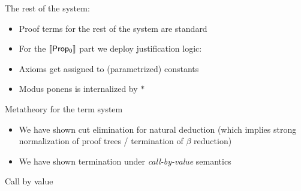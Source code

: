 \documentclass{beamer}
\begin{document}
  \begin{frame}{The rest of the system}:
    \begin{itemize}
    \item[] Proof terms for the rest of the system are standard
    \item[] For the ${\sf \llbracket Prop_0\rrbracket}$ part we deploy justification logic:
    \item[] Axioms get assigned to (parametrized) constants
      \item Modus ponens is internalized by $*$
  \end{itemize}
\end{frame}
\begin{frame}{Metatheory for the term system}
  \begin {itemize}
    \item  We have shown cut elimination for natural deduction (which implies strong normalization of proof trees / termination of $\beta$ reduction)
    \item  We have shown termination under \textit{call-by-value} semantics 
    
\end{itemize}
\end{frame}
\begin{frame}{Call by value}
\end{frame}
\end{document}
